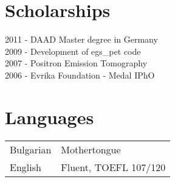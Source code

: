 \section*{Scholarships}
2011 - DAAD Master degree in Germany \\
2009 - Development of egs\_pet code \\
2007 - Positron Emission Tomography\\
2006 - Evrika Foundation - Medal IPhO\\
\section*{Languages}
\begin{tabular}{ l l }
Bulgarian & Mothertongue \\
English   & Fluent, TOEFL 107/120\\
\end{tabular}
